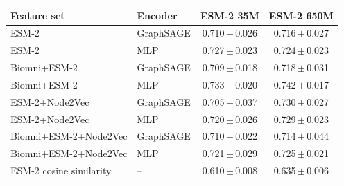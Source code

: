 \begin{tabular}{llcc}
\toprule
Feature set & Encoder & ESM-2 35M & ESM-2 650M \\
\midrule
ESM-2 & GraphSAGE & 0.710\,$\pm$\,0.026 & 0.716\,$\pm$\,0.027 \\
ESM-2 & MLP & 0.727\,$\pm$\,0.023 & 0.724\,$\pm$\,0.023 \\
Biomni+ESM-2 & GraphSAGE & 0.709\,$\pm$\,0.018 & 0.718\,$\pm$\,0.031 \\
Biomni+ESM-2 & MLP & 0.733\,$\pm$\,0.020 & 0.742\,$\pm$\,0.017 \\
ESM-2+Node2Vec & GraphSAGE & 0.705\,$\pm$\,0.037 & 0.730\,$\pm$\,0.027 \\
ESM-2+Node2Vec & MLP & 0.720\,$\pm$\,0.026 & 0.729\,$\pm$\,0.023 \\
Biomni+ESM-2+Node2Vec & GraphSAGE & 0.710\,$\pm$\,0.022 & 0.714\,$\pm$\,0.044 \\
Biomni+ESM-2+Node2Vec & MLP & 0.721\,$\pm$\,0.029 & 0.725\,$\pm$\,0.021 \\
ESM-2 cosine similarity & -- & 0.610\,$\pm$\,0.008 & 0.635\,$\pm$\,0.006 \\
\bottomrule
\end{tabular}
